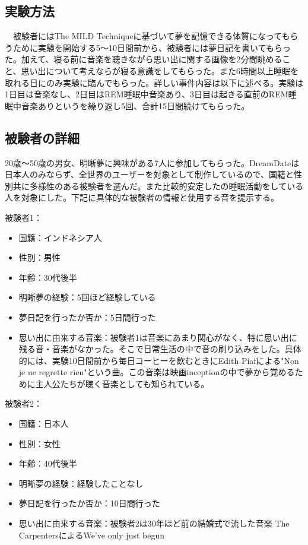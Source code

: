 \subsection{実験方法}
　被験者にはThe MILD Techniqueに基づいて夢を記憶できる体質になってもらうために実験を開始する5〜10日間前から、被験者には夢日記を書いてもらった。加えて、寝る前に音楽を聴きながら思い出に関する画像を2分間眺めること、思い出について考えならが寝る意識をしてもらった。また6時間以上睡眠を取れる日にのみ実験に臨んでもらった。詳しい事件内容は以下に述べる。実験は1日目は音楽なし、2日目はREM睡眠中音楽あり、3日目は起きる直前のREM睡眠中音楽ありというを繰り返し5回、合計15日間続けてもらった。

\subsection{被験者の詳細}
20歳〜50歳の男女、明晰夢に興味がある7人に参加してもらった。DreamDateは日本人のみならず、全世界のユーザーを対象として制作しているので、国籍と性別共に多様性のある被験者を選んだ。また比較的安定したの睡眠活動をしている人を対象にした。下記に具体的な被験者の情報と使用する音を提示する。

被験者1：
\begin{itemize}
\item 国籍：インドネシア人
\item 性別：男性
\item 年齢：30代後半
\item 明晰夢の経験：5回ほど経験している
\item 夢日記を行ったか否か：5日間行った
\item 思い出に由来する音楽：被験者1は音楽にあまり関心がなく、特に思い出に残る音・音楽がなかった。そこで日常生活の中で音の刷り込みをした。具体的には、実験10日間前から毎日コーヒーを飲むときにEdith Piafによる"Non je ne regrette rien"という曲。この音楽は映画inceptionの中で夢から覚めるために主人公たちが聴く音楽としても知られている。

\end{itemize}
被験者2：
\begin{itemize}
\item 国籍：日本人
\item 性別：女性
\item 年齢：40代後半
\item 明晰夢の経験：経験したことなし
\item 夢日記を行ったか否か：10日間行った
\item 思い出に由来する音楽：被験者2は30年ほど前の結婚式で流した音楽 The CarpentersによるWe've only just begun
\end{itemize}

